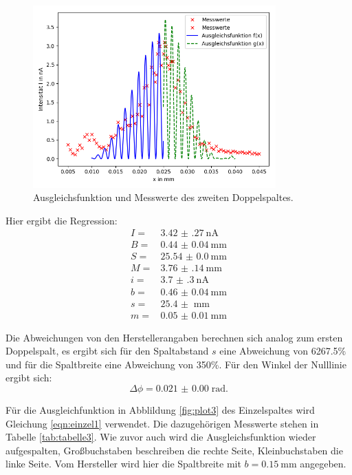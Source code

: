 
\begin{figure}
  \centering
  \includegraphics[height=7cm]{Figure_2.png}
  \caption{Ausgleichsfunktion und Messwerte des zweiten Doppelspaltes.}
  \label{fig:plot2}
\end{figure}

Hier ergibt die Regression:
\begin{align*}
 I =& \SI{3.42(27)}{\nA}\\
 B =& \SI{0.44(4)}{\mm}\\
 S =& \SI{25.54(0)}{\mm}\\
 M =& \SI{3.76(14)}{\mm}\\
 i =& \SI{3.7(3)}{\nA}\\
 b =& \SI{0.46(4)}{\mm}\\
 s =& \SI{25.4(0)}{\mm}\\
 m =& \SI{0.05(1)}{\mm}
\end{align*}

Die Abweichungen von den Herstellerangaben berechnen sich analog zum
ersten Doppelspalt, es ergibt sich für den Spaltabstand $s$ eine Abweichung von
6267.5\% und für die Spaltbreite eine Abweichung von 350\%. Für den Winkel der
Nulllinie ergibt sich:
\begin{equation}
  \Delta \phi =\SI{0.021(0)}\; \text{rad}.
\end{equation}

Für die Ausgleichfunktion in Abblildung \ref{fig:plot3} des Einzelspaltes
wird Gleichung \ref{eqn:einzel1} verwendet.
Die dazugehörigen Messwerte stehen in Tabelle \ref{tab:tabelle3}.
Wie zuvor auch wird die Ausgleichsfunktion wieder aufgespalten, Großbuchstaben
beschreiben die rechte Seite, Kleinbuchstaben die linke Seite.
Vom Hersteller wird hier die Spaltbreite mit $b=\SI{0,15}{\mm}$ angegeben.


